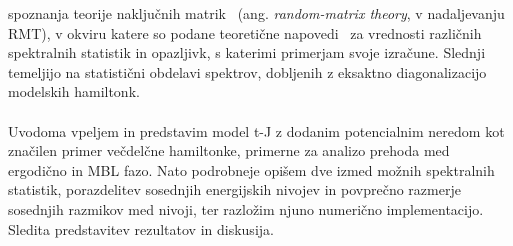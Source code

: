 \documentclass[10pt,a4paper]{article}
\begin{document}
spoznanja teorije naključnih matrik~\cite{d2016quantum} (ang. \emph{random-matrix theory}, v nadaljevanju RMT), v okviru katere so podane teoretične napovedi~\cite{atas2013distribution} za vrednosti različnih spektralnih statistik in opazljivk, s katerimi primerjam svoje izračune. Slednji temeljijo na statistični obdelavi spektrov, dobljenih z eksaktno diagonalizacijo modelskih hamiltonk. \\\\
Uvodoma vpeljem in predstavim model t-J z dodanim potencialnim neredom kot značilen primer večdelčne hamiltonke, primerne za analizo prehoda med ergodično in MBL fazo. Nato podrobneje opišem dve izmed možnih spektralnih statistik, porazdelitev sosednjih energijskih nivojev in povprečno razmerje sosednjih razmikov med nivoji, ter razložim njuno numerično implementacijo. Sledita predstavitev rezultatov in diskusija. 

\end{document}
